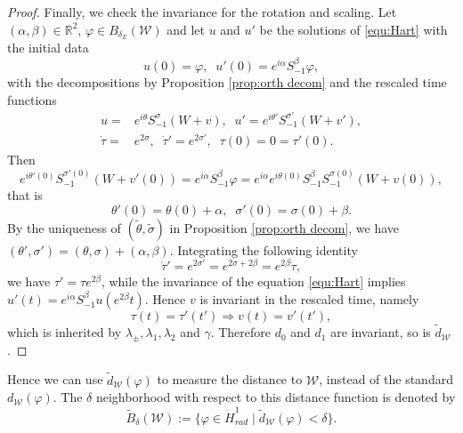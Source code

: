 \documentclass[reqno, 11pt]{amsart}
\numberwithin{equation}{section}
\newcommand{\R}{\mathbb{R}}
\theoremstyle{plain}
\theoremstyle{definition}
\numberwithin{equation}{section}
\numberwithin{theorem}{section}
\numberwithin{equation}{section}
\numberwithin{equation}{section}
\numberwithin{theorem}{section}
\begin{document}
\begin{proof}
		Finally, we check the invariance for the rotation and scaling. Let $(\alpha,\beta)\in\R^2$, $\varphi\in B_{\delta_E}(\mathcal{W})$ and let $u$ and $u'$ be the solutions of \eqref{equ:Hart} with the initial data
		\begin{equation*}
		u(0)=\varphi,\;\; u'(0)=e^{i\alpha} S_{-1}^{\beta}\varphi,
		\end{equation*}
		with the decompositions by Proposition \ref{prop:orth decom} and the rescaled time functions
		\begin{align*}
		u=&e^{i\theta} S_{-1}^{\sigma}(W+v),\;\;u'=e^{i\theta'} S_{-1}^{\sigma'}(W+v'),\\ \dot\tau=&e^{2\sigma},\;\;\dot\tau'=e^{2\sigma'},\;\;\tau(0)=0=\tau'(0).
		\end{align*}
		Then 
		\begin{equation*}
		e^{i\theta'(0)} S_{-1}^{\sigma'(0)}(W+v'(0))=e^{i\alpha} S_{-1}^{\beta}\varphi=e^{i\alpha}e^{i\theta(0)}S_{-1}^{\beta} S_{-1}^{\sigma(0)}(W+v(0)),
		\end{equation*}
		that is 
		\begin{equation*}
		\theta'(0)=\theta(0)+\alpha,\;\;\sigma'(0)=\sigma(0)+\beta.
		\end{equation*}
		By the uniqueness of $\left(\widetilde{\theta},\widetilde{\sigma} \right)$ in Proposition \ref{prop:orth decom}, we have $\left(\theta',\sigma' \right)=\left(\theta,\sigma\right)+(\alpha,\beta)$.
		Integrating the following identity
		\begin{equation*}
		\dot\tau'=e^{2\sigma'}=e^{2\sigma+2\beta}=e^{2\beta}\dot\tau,
		\end{equation*}
		we have $\tau'=\tau e^{2\beta}$, while the invariance of the equation \eqref{equ:Hart} implies $u'(t)=e^{i\alpha} S_{-1}^{\beta}u(e^{2\beta}t)$. Hence $v$ is invariant in the rescaled time, namely
		\begin{equation*}
		\tau(t)=\tau'(t') \Longrightarrow v(t)=v'(t'),
		\end{equation*}
		which is inherited by $\lambda_{\pm},\lambda_1,\lambda_2$ and $\gamma$. Therefore $d_0$ and $d_1$ are invariant, so is $\widetilde{d}_{\mathcal{W}}$.
	\end{proof}
	Hence we can use $\widetilde{d}_{\mathcal{W}}(\varphi)$ to measure the distance to $\mathcal{W}$, instead of the standard $d_{\mathcal{W}}(\varphi)$. The $\delta$ neighborhood with respect to this distance function is denoted by
	\begin{equation*}
	\widetilde{B}_{\delta}(\mathcal{W}):=\{ \varphi\in \dot H^1_{rad}\;|\;\widetilde{d}_{\mathcal{W}}(\varphi)<\delta \}.
	\end{equation*}	
	
\end{document}
